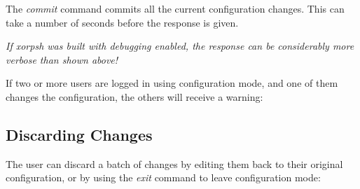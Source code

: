 \noindent{}
\vspace{0.1in}

The \emph{commit} command commits all the current configuration changes.
This can take a number of seconds before the response is given.

{\it If xorpsh was built with debugging enabled, the response can be
considerably more verbose than shown above!}

If two or more users are logged in using configuration mode, and one
of them changes the configuration, the others will receive a warning:
\vspace{0.1in}

\noindent{}
\vspace{0.1in}


\subsection{Discarding Changes}

The user can discard a batch of changes by editing them back to their
original configuration, or by using the \emph{exit} command to leave
configuration mode:
\vspace{0.1in}

\noindent{}
\vspace{0.1in}


